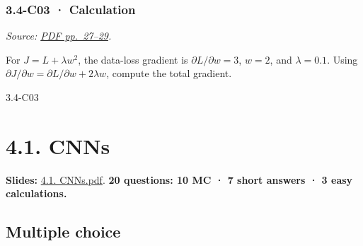 \noindent\begin{minipage}{\linewidth}

\subsubsection{3.4-C03 · Calculation}\label{c03-calculation-10}

\emph{Source:
\href{../Lecture\%20Slides/3.4.\%20Deep\%20Learning\%20Fundamentals\%20II.pdf\#page=27}{PDF
pp.~27--29}.}

For \(J=L+\lambda w^2\), the data-loss gradient is
\(\partial L/\partial w=3\), \(w=2\), and \(\lambda=0.1\). Using
\(\partial J/\partial w=\partial L/\partial w+2\lambda w\), compute the
total gradient.

\begin{solution}[26mm]{3.4-C03}

\end{solution}
\end{minipage}\par\medskip

\clearpage

\section{4.1. CNNs}\label{cnns}

\textbf{Slides:} \href{../Lecture\%20Slides/4.1.\%20CNNs.pdf}{4.1.
CNNs.pdf}. \textbf{20 questions: 10 MC · 7 short answers · 3 easy
calculations.}

\subsection{Multiple choice}\label{multiple-choice-11}

